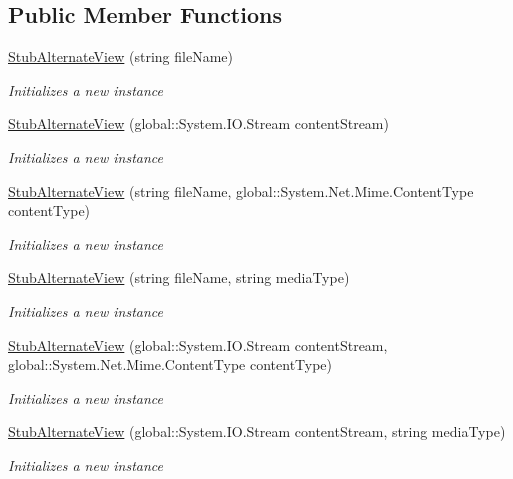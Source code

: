 \subsection*{Public Member Functions}
\begin{DoxyCompactItemize}
\item 
\hyperlink{class_system_1_1_net_1_1_mail_1_1_fakes_1_1_stub_alternate_view_a99d7f39672a7d5a29c0b96f3696a2a26}{Stub\-Alternate\-View} (string file\-Name)
\begin{DoxyCompactList}\small\item\em Initializes a new instance\end{DoxyCompactList}\item 
\hyperlink{class_system_1_1_net_1_1_mail_1_1_fakes_1_1_stub_alternate_view_ad8be3fb388bcfecfba01ce8879e6f487}{Stub\-Alternate\-View} (global\-::\-System.\-I\-O.\-Stream content\-Stream)
\begin{DoxyCompactList}\small\item\em Initializes a new instance\end{DoxyCompactList}\item 
\hyperlink{class_system_1_1_net_1_1_mail_1_1_fakes_1_1_stub_alternate_view_a35e09b4aca7a6bcddeb09a11c1b7fcf5}{Stub\-Alternate\-View} (string file\-Name, global\-::\-System.\-Net.\-Mime.\-Content\-Type content\-Type)
\begin{DoxyCompactList}\small\item\em Initializes a new instance\end{DoxyCompactList}\item 
\hyperlink{class_system_1_1_net_1_1_mail_1_1_fakes_1_1_stub_alternate_view_a88d3eb6900851a3c30f87cf01475d088}{Stub\-Alternate\-View} (string file\-Name, string media\-Type)
\begin{DoxyCompactList}\small\item\em Initializes a new instance\end{DoxyCompactList}\item 
\hyperlink{class_system_1_1_net_1_1_mail_1_1_fakes_1_1_stub_alternate_view_a7b87d9bc99264be851e33169db72c5f9}{Stub\-Alternate\-View} (global\-::\-System.\-I\-O.\-Stream content\-Stream, global\-::\-System.\-Net.\-Mime.\-Content\-Type content\-Type)
\begin{DoxyCompactList}\small\item\em Initializes a new instance\end{DoxyCompactList}\item 
\hyperlink{class_system_1_1_net_1_1_mail_1_1_fakes_1_1_stub_alternate_view_ab506ad53cdef53d17db417edc6d714cb}{Stub\-Alternate\-View} (global\-::\-System.\-I\-O.\-Stream content\-Stream, string media\-Type)
\begin{DoxyCompactList}\small\item\em Initializes a new instance\end{DoxyCompactList}\end{DoxyCompactItemize}
